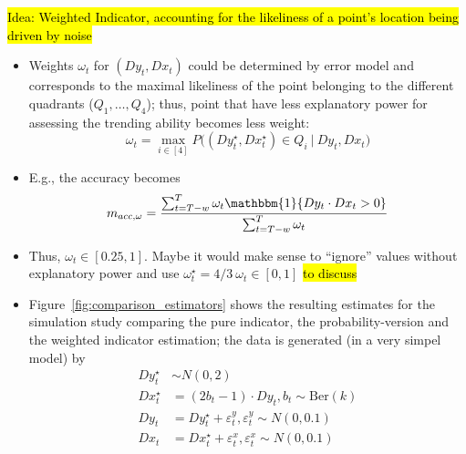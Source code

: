 \documentclass[oneside]{article}
\theoremstyle{plain}%
\theoremstyle{definition}
\newcommand{\ind}[1]{\mathbbm{1}\{#1\}}
\newcommand{\ydiff}{D y}
\newcommand{\ydifft}{Dy^\star}
\newcommand{\xdiff}{Dx}
\newcommand{\xdifft}{Dx^\star}
\newcommand{\Ber}{\text{Ber}}
\newcommand{\cond}{\:\lvert\:}
\begin{document}
\hl{Idea: Weighted Indicator, accounting for the likeliness of a point's location being driven by noise}

\begin{itemize}
  \item Weights $\omega_t$ for $(\ydiff_t, \xdiff_t)$ could be determined by error model and corresponds to the maximal likeliness of the point belonging to the different quadrants ($Q_1, \dots, Q_4$); thus, point that have less explanatory power for assessing the trending ability becomes less weight:
 	\begin{equation}
  		\omega_t = \max_{i \in [4]} {P\big( (\ydifft_t, \xdifft_t) \in Q_i \cond \ydiff_t, \xdiff_t \big)} 
	\end{equation}
	\item E.g., the accuracy becomes
	\begin{equation}
  m_{acc, \omega} = \frac{\sum_{t=T-w}^T \omega_t \ind{\ydiff_t \cdot \xdiff_t > 0} }{\sum_{t=T-w}^T \omega_t}
\end{equation}
	\item Thus, $\omega_t \in [0.25, 1]$. Maybe it would make sense to \enquote{ignore} values without explanatory power and use $\omega_t^\star = 4/3 \ \omega_t \in [0, 1]$ \hl{to discuss}
	\item Figure~\ref{fig:comparison_estimators} shows the resulting estimates for the simulation study comparing the pure indicator, the probability-version and the weighted indicator estimation; the data is generated (in a very simpel model) by
	\begin{align}
		\ydifft_t &\sim N(0, 2) \\
		\xdifft_t &= (2 b_t - 1) \cdot \ydiff_t , b_t \sim \Ber (k) \\
		\ydiff_t &= \ydifft_t + \varepsilon_t^y, \varepsilon_t^y \sim N(0, 0.1) \\
		\xdiff_t &= \xdifft_t + \varepsilon_t^x, \varepsilon_t^x \sim N(0, 0.1) \\
	\end{align}
\end{itemize}
\end{document}
